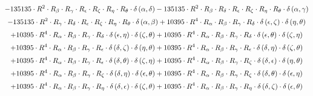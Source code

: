 \begin{subequations}
\begin{gather}
 \\[0.2em] \notag 		 - 135135 \cdot R^{2} \cdot R_{\beta{}} \cdot R_{\gamma{}} \cdot R_{\epsilon{}} \cdot R_{\zeta{}} \cdot R_{\eta{}} \cdot R_{\theta{}} \cdot \delta{}\left(\alpha{}, \delta{}\right)- 135135 \cdot R^{2} \cdot R_{\beta{}} \cdot R_{\delta{}} \cdot R_{\epsilon{}} \cdot R_{\zeta{}} \cdot R_{\eta{}} \cdot R_{\theta{}} \cdot \delta{}\left(\alpha{}, \gamma{}\right) 
 \\[0.2em] \notag 		 - 135135 \cdot R^{2} \cdot R_{\gamma{}} \cdot R_{\delta{}} \cdot R_{\epsilon{}} \cdot R_{\zeta{}} \cdot R_{\eta{}} \cdot R_{\theta{}} \cdot \delta{}\left(\alpha{}, \beta{}\right)+ 10395 \cdot R^{4} \cdot R_{\alpha{}} \cdot R_{\beta{}} \cdot R_{\gamma{}} \cdot R_{\delta{}} \cdot \delta{}\left(\epsilon{}, \zeta{}\right) \cdot \delta{}\left(\eta{}, \theta{}\right) 
 \\[0.2em] \notag 		 + 10395 \cdot R^{4} \cdot R_{\alpha{}} \cdot R_{\beta{}} \cdot R_{\gamma{}} \cdot R_{\delta{}} \cdot \delta{}\left(\epsilon{}, \eta{}\right) \cdot \delta{}\left(\zeta{}, \theta{}\right)+ 10395 \cdot R^{4} \cdot R_{\alpha{}} \cdot R_{\beta{}} \cdot R_{\gamma{}} \cdot R_{\delta{}} \cdot \delta{}\left(\epsilon{}, \theta{}\right) \cdot \delta{}\left(\zeta{}, \eta{}\right) 
 \\[0.2em] \notag 		 + 10395 \cdot R^{4} \cdot R_{\alpha{}} \cdot R_{\beta{}} \cdot R_{\gamma{}} \cdot R_{\epsilon{}} \cdot \delta{}\left(\delta{}, \zeta{}\right) \cdot \delta{}\left(\eta{}, \theta{}\right)+ 10395 \cdot R^{4} \cdot R_{\alpha{}} \cdot R_{\beta{}} \cdot R_{\gamma{}} \cdot R_{\epsilon{}} \cdot \delta{}\left(\delta{}, \eta{}\right) \cdot \delta{}\left(\zeta{}, \theta{}\right) 
 \\[0.2em] \notag 		 + 10395 \cdot R^{4} \cdot R_{\alpha{}} \cdot R_{\beta{}} \cdot R_{\gamma{}} \cdot R_{\epsilon{}} \cdot \delta{}\left(\delta{}, \theta{}\right) \cdot \delta{}\left(\zeta{}, \eta{}\right)+ 10395 \cdot R^{4} \cdot R_{\alpha{}} \cdot R_{\beta{}} \cdot R_{\gamma{}} \cdot R_{\zeta{}} \cdot \delta{}\left(\delta{}, \epsilon{}\right) \cdot \delta{}\left(\eta{}, \theta{}\right) 
 \\[0.2em] \notag 		 + 10395 \cdot R^{4} \cdot R_{\alpha{}} \cdot R_{\beta{}} \cdot R_{\gamma{}} \cdot R_{\zeta{}} \cdot \delta{}\left(\delta{}, \eta{}\right) \cdot \delta{}\left(\epsilon{}, \theta{}\right)+ 10395 \cdot R^{4} \cdot R_{\alpha{}} \cdot R_{\beta{}} \cdot R_{\gamma{}} \cdot R_{\zeta{}} \cdot \delta{}\left(\delta{}, \theta{}\right) \cdot \delta{}\left(\epsilon{}, \eta{}\right) 
 \\[0.2em] \notag 		 + 10395 \cdot R^{4} \cdot R_{\alpha{}} \cdot R_{\beta{}} \cdot R_{\gamma{}} \cdot R_{\eta{}} \cdot \delta{}\left(\delta{}, \epsilon{}\right) \cdot \delta{}\left(\zeta{}, \theta{}\right)+ 10395 \cdot R^{4} \cdot R_{\alpha{}} \cdot R_{\beta{}} \cdot R_{\gamma{}} \cdot R_{\eta{}} \cdot \delta{}\left(\delta{}, \zeta{}\right) \cdot \delta{}\left(\epsilon{}, \theta{}\right) 

\end{gather}
\end{subequations}
